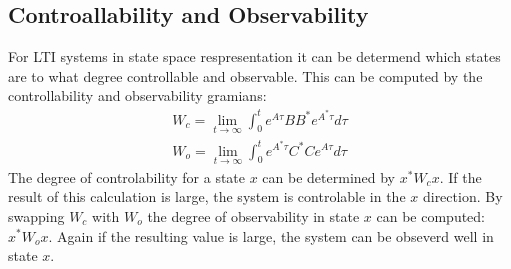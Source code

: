 \subsection{Controallability and Observability}
For LTI systems in state space respresentation it can be determend which states are to what degree controllable and observable.
This can be computed by the controllability and observability gramians:
\begin{gather}
W_c = \lim_{t \to \infty} \int_{0}^{t} e^{A\tau}BB^{*}e^{A^{*}\tau}d\tau \label{gram-ctrl}\\
W_o = \lim_{t \to \infty} \int_{0}^{t} e^{A^{*}\tau}C^{*}Ce^{A\tau}d\tau \label{gram-obsv}
\end{gather}
The degree of controlability for a state \(x\) can be determined by \(x^{*}W_cx\).
If the result of this calculation is large, the system is controlable in the \(x\) direction.
By swapping \(W_c\) with \(W_o\) the degree of observability in state \(x\) can be computed: \(x^{*}W_ox\).
Again if the resulting value is large, the system can be obseverd well in state \(x\).
\cite{brunton_kutz_2019d}
